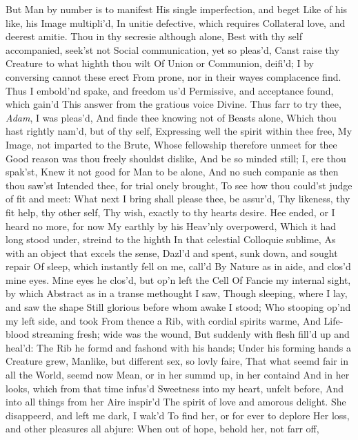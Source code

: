 \documentclass[11pt]{book}
\begin{document}
But Man by number is to manifest 
His single imperfection, and beget 
Like of his like, his Image multipli'd, 
In unitie defective, which requires 
Collateral love, and deerest amitie. 
Thou in thy secresie although alone, 
Best with thy self accompanied, seek'st not 
Social communication, yet so pleas'd, 
Canst raise thy Creature to what highth thou wilt 
Of Union or Communion, deifi'd; 
I by conversing cannot these erect 
From prone, nor in their wayes complacence find. 
Thus I embold'nd spake, and freedom us'd 
Permissive, and acceptance found, which gain'd 
This answer from the gratious voice Divine. 
\quad Thus farr to try thee, \textit{Adam}, I was pleas'd, 
And finde thee knowing not of Beasts alone, 
Which thou hast rightly nam'd, but of thy self, 
Expressing well the spirit within thee free, 
My Image, not imparted to the Brute, 
Whose fellowship therefore unmeet for thee 
Good reason was thou freely shouldst dislike, 
And be so minded still; I, ere thou spak'st, 
Knew it not good for Man to be alone, 
And no such companie as then thou saw'st 
Intended thee, for trial onely brought, 
To see how thou could'st judge of fit and meet: 
What next I bring shall please thee, be assur'd, 
Thy likeness, thy fit help, thy other self, 
Thy wish, exactly to thy hearts desire. 
\quad Hee ended, or I heard no more, for now 
My earthly by his Heav'nly overpowerd, 
Which it had long stood under, streind to the highth 
In that celestial Colloquie sublime, 
As with an object that excels the sense, 
Dazl'd and spent, sunk down, and sought repair 
Of sleep, which instantly fell on me, call'd 
By Nature as in aide, and clos'd mine eyes. 
Mine eyes he clos'd, but op'n left the Cell 
Of Fancie my internal sight, by which 
Abstract as in a transe methought I saw, 
Though sleeping, where I lay, and saw the shape 
Still glorious before whom awake I stood; 
Who stooping op'nd my left side, and took 
From thence a Rib, with cordial spirits warme, 
And Life-blood streaming fresh; wide was the wound, 
But suddenly with flesh fill'd up and heal'd: 
The Rib he formd and fashond with his hands; 
Under his forming hands a Creature grew, 
Manlike, but different sex, so lovly faire, 
That what seemd fair in all the World, seemd now 
Mean, or in her summd up, in her containd 
And in her looks, which from that time infus'd 
Sweetness into my heart, unfelt before, 
And into all things from her Aire inspir'd 
The spirit of love and amorous delight. 
She disappeerd, and left me dark, I wak'd 
To find her, or for ever to deplore 
Her loss, and other pleasures all abjure: 
When out of hope, behold her, not farr off, 
\end{document}
